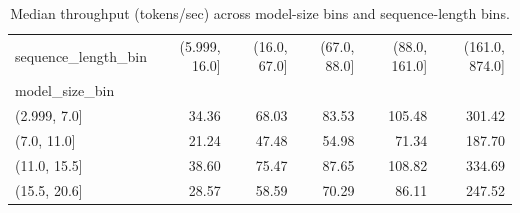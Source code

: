 \begin{table}[t]
\centering
\caption{Median throughput (tokens/sec) across model-size bins and sequence-length bins.}
\label{tab:ai_workload_median_throughput}
\begin{tabular}{lrrrrr}
\toprule
sequence_length_bin & (5.999, 16.0] & (16.0, 67.0] & (67.0, 88.0] & (88.0, 161.0] & (161.0, 874.0] \\
model_size_bin &  &  &  &  &  \\
\midrule
(2.999, 7.0] & 34.36 & 68.03 & 83.53 & 105.48 & 301.42 \\
(7.0, 11.0] & 21.24 & 47.48 & 54.98 & 71.34 & 187.70 \\
(11.0, 15.5] & 38.60 & 75.47 & 87.65 & 108.82 & 334.69 \\
(15.5, 20.6] & 28.57 & 58.59 & 70.29 & 86.11 & 247.52 \\
\bottomrule
\end{tabular}

\end{table}
